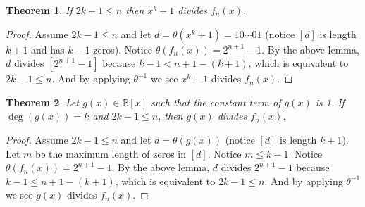 \documentclass{article}
\newcommand{\B}{\mathbb{B}}
\newtheorem{theorem}{Theorem}[section]
\begin{document}
    \begin{theorem}
        If $2k - 1 \leq n$ then $x^k + 1$ divides $f_n(x)$.
    \end{theorem}
    \begin{proof}
        Assume $2k - 1 \leq n$ and let $d = \theta(x^k + 1) = 10 \cdots 01$ (notice $[d]$ is
        length $k+1$ and has $k-1$ zeros). Notice $\theta(f_n(x)) = 2^{n+1} - 1$. By the
        above lemma, $d$ divides $[2^{n+1} - 1]$ because $k-1 < n+1-(k+1)$, which is
        equivalent to $2k-1 \leq n$. And by applying $\theta^{-1}$ we see $x^k+1$ divides $f_n(x)$.
    \end{proof}

    \begin{theorem}
        Let $g(x) \in \B[x]$ such that the constant term of $g(x)$ is 1. If $\deg(g(x)) = k$
        and $2k-1 \leq n$, then $g(x)$ divides $f_n(x)$.
    \end{theorem}
    \begin{proof}
        Assume $2k-1 \leq n$ and let $d = \theta(g(x))$ (notice $[d]$ is length $k+1$). Let $m$ be
        the maximum length of zeros in $[d]$. Notice $m \leq k-1$. Notice $\theta(f_n(x)) = 2^{n+1}-1$.
        By the above lemma, $d$ divides $2^{n+1}-1$ because $k-1 \leq n+1-(k+1)$, which is
        equivalent to $2k-1 \leq n$. And by applying $\theta^{-1}$ we see $g(x)$ divides $f_n(x)$.
    \end{proof}
    \pagebreak
\end{document}
